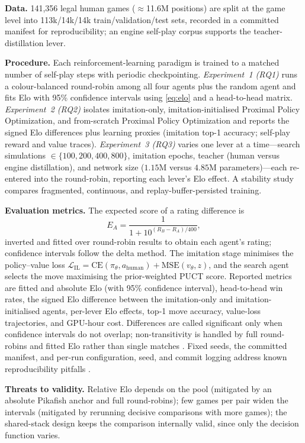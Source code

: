 \documentclass[conference]{IEEEtran}
\begin{document}
\textbf{Data.} 141{,}356 legal human games ($\approx$11.6M positions) are split at
the game level into 113k/14k/14k train/validation/test sets, recorded in a
committed manifest for reproducibility; an engine self-play corpus supports the
teacher-distillation lever.

\textbf{Procedure.} Each reinforcement-learning paradigm is trained to a matched
number of self-play steps with periodic checkpointing. \emph{Experiment~1 (RQ1)} runs a
colour-balanced round-robin among all four agents plus the random agent and fits
Elo with 95\% confidence intervals using \eqref{eq:elo} and a head-to-head matrix.
\emph{Experiment~2 (RQ2)} isolates imitation-only, imitation-initialised Proximal
Policy Optimization, and from-scratch Proximal Policy Optimization and reports the
signed Elo differences plus learning proxies (imitation top-1 accuracy;
self-play reward and value traces). \emph{Experiment~3 (RQ3)} varies one lever at
a time---search simulations $\in\{100,200,400,800\}$, imitation epochs, teacher
(human versus engine distillation), and network size ($1.15$M versus $4.85$M
parameters)---each re-entered into the round-robin, reporting each lever's Elo
effect. A stability study compares fragmented, continuous, and
replay-buffer-persisted training.

\textbf{Evaluation metrics.} The expected score of a rating difference is
\begin{equation}
\label{eq:elo}
E_A = \frac{1}{1 + 10^{(R_B - R_A)/400}},
\end{equation}
inverted and fitted over round-robin results to obtain each agent's rating;
confidence intervals follow the delta method. The imitation stage minimises the
policy--value loss $\mathcal{L}_{\mathrm{IL}}{=}\mathrm{CE}(\pi_\theta,
a_{\text{human}}){+}\mathrm{MSE}(v_\theta,z)$, and the search agent selects the
move maximising the prior-weighted PUCT score. Reported metrics are fitted and
absolute Elo (with 95\% confidence interval), head-to-head win rates, the signed
Elo difference between the imitation-only and imitation-initialised agents,
per-lever Elo effects, top-1 move accuracy, value-loss trajectories, and GPU-hour
cost. Differences are called significant only when confidence intervals do not
overlap; non-transitivity is handled by full round-robins and fitted Elo rather
than single matches \cite{li2023jiangjun}. Fixed seeds, the committed manifest,
and per-run configuration, seed, and commit logging address known reproducibility
pitfalls \cite{henderson2018}.

\textbf{Threats to validity.} Relative Elo depends on the pool (mitigated by an
absolute Pikafish anchor and full round-robins); few games per pair widen the
intervals (mitigated by rerunning decisive comparisons with more games); the
shared-stack design keeps the comparison internally valid, since only the
decision function varies.
\end{document}
